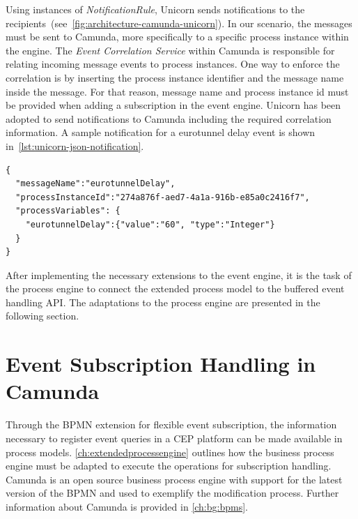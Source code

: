Using instances of \textit{NotificationRule}, Unicorn sends notifications to the recipients~(see~\autoref{fig:architecture-camunda-unicorn}). In our scenario, the messages must be sent to Camunda, more specifically to a specific process instance within the engine.
The \textit{Event Correlation Service} within Camunda is responsible for relating incoming message events to process instances. One way to enforce the correlation is by inserting the process instance identifier and the message name inside the message.
For that reason, message name and process instance id must be provided when adding a subscription in the event engine. 
Unicorn has been adopted to send notifications to Camunda including the required correlation information. A sample notification for a eurotunnel delay event is shown in~\autoref{lst:unicorn-json-notification}.

\pagebreak

\begin{lstlisting}[caption={Example of a JSON notification sent by UNICORN},label=lst:unicorn-json-notification]
{
  "messageName":"eurotunnelDelay",
  "processInstanceId":"274a876f-aed7-4a1a-916b-e85a0c2416f7",
  "processVariables": { 
    "eurotunnelDelay":{"value":"60", "type":"Integer"}
  }
}
\end{lstlisting}

After implementing the necessary extensions to the event engine, it is the task of the process engine to connect the extended process model to the buffered event handling API.
The adaptations to the process engine are presented in the following section.

\section{Event Subscription Handling in Camunda}\label{ch:implcamunda}

Through the BPMN extension for flexible event subscription, the information necessary to register event queries in a CEP platform can be made available in process models.
\autoref{ch:extendedprocessengine} outlines how the business process engine must be adapted to execute the operations for subscription handling.
Camunda is an open source business process engine with support for the latest version of the BPMN and used to exemplify the modification process. Further information about Camunda is provided in \autoref{ch:bg:bpms}.

